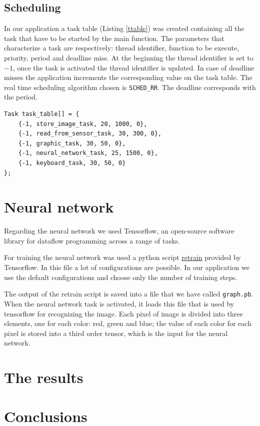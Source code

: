 \documentclass[12pt]{article}
\begin{document}
\subsection{Scheduling}
In our application a task table (Listing \ref{ttable}) was created containing
all the task that have to be started by the main function. The parameters
that characterize a task are respectively: thread identifier, function to be
execute, priority, period and deadline miss. At the beginning the thread
identifier is set to $-1$, once the task is activated the thread identifier
is updated. In case of deadline misses the application increments the
corresponding value on the task table. The real time scheduling algorithm
chosen is \texttt{SCHED\_RR}. The deadline corresponds with the period.

\begin{lstlisting}[caption={Task table}, captionpos=b, label={ttable}]
Task task_table[] = {
    {-1, store_image_task, 20, 1000, 0},
    {-1, read_from_sensor_task, 30, 300, 0},
    {-1, graphic_task, 30, 50, 0},
    {-1, neural_network_task, 25, 1500, 0},
    {-1, keyboard_task, 30, 50, 0}
};
\end{lstlisting}

\section{Neural network}
Regarding the neural network we used Tensorflow, an open-source software 
library for dataflow programming across a range of tasks. 

For training the neural network was used a python script
\href{https://www.tensorflow.org/hub/tutorials/image\_retraining}{retrain}
provided by Tensorflow. In this file a lot of configurations are possible. In
our application we use the default configurations and choose only the number
of training steps.

The output of the retrain script is saved into a file that we have called
\texttt{graph.pb}. When the neural network task is activated, it loads this
file that is used by tensorflow for recognizing the image. Each pixel of
image is divided into three elements, one for each color: red, green and
blue; the value of each color for each pixel is stored into a third order
tensor, which is the input for the neural network.

\section{The results}

\section{Conclusions}
\end{document}
